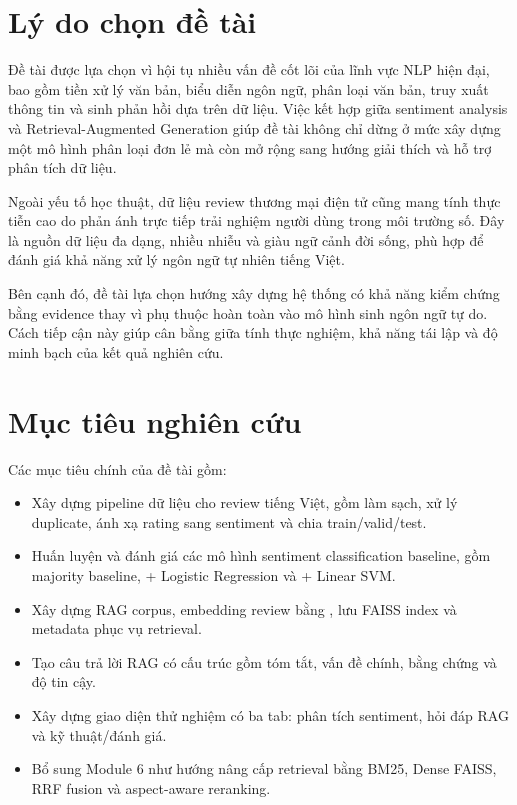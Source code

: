 \section{Lý do chọn đề tài}
Đề tài được lựa chọn vì hội tụ nhiều vấn đề cốt lõi của lĩnh vực NLP hiện đại, bao gồm tiền xử lý văn bản, biểu diễn ngôn ngữ, phân loại văn bản, truy xuất thông tin và sinh phản hồi dựa trên dữ liệu. Việc kết hợp giữa sentiment analysis và Retrieval-Augmented Generation giúp đề tài không chỉ dừng ở mức xây dựng một mô hình phân loại đơn lẻ mà còn mở rộng sang hướng giải thích và hỗ trợ phân tích dữ liệu.

Ngoài yếu tố học thuật, dữ liệu review thương mại điện tử cũng mang tính thực tiễn cao do phản ánh trực tiếp trải nghiệm người dùng trong môi trường số. Đây là nguồn dữ liệu đa dạng, nhiều nhiễu và giàu ngữ cảnh đời sống, phù hợp để đánh giá khả năng xử lý ngôn ngữ tự nhiên tiếng Việt.

Bên cạnh đó, đề tài lựa chọn hướng xây dựng hệ thống có khả năng kiểm chứng bằng evidence thay vì phụ thuộc hoàn toàn vào mô hình sinh ngôn ngữ tự do. Cách tiếp cận này giúp cân bằng giữa tính thực nghiệm, khả năng tái lập và độ minh bạch của kết quả nghiên cứu.

\section{Mục tiêu nghiên cứu}
Các mục tiêu chính của đề tài gồm:
\begin{itemize}
    \item Xây dựng pipeline dữ liệu cho review tiếng Việt, gồm làm sạch, xử lý duplicate, ánh xạ rating sang sentiment và chia train/valid/test.
    \item Huấn luyện và đánh giá các mô hình sentiment classification baseline, gồm majority baseline, \TFIDF{} + Logistic Regression và \TFIDF{} + Linear SVM.
    \item Xây dựng RAG corpus, embedding review bằng \MultilingualE{}, lưu FAISS index và metadata phục vụ retrieval.
    \item Tạo câu trả lời RAG có cấu trúc gồm tóm tắt, vấn đề chính, bằng chứng và độ tin cậy.
    \item Xây dựng giao diện thử nghiệm có ba tab: phân tích sentiment, hỏi đáp RAG và kỹ thuật/đánh giá.
    \item Bổ sung Module 6 như hướng nâng cấp retrieval bằng BM25, Dense FAISS, RRF fusion và aspect-aware reranking.
\end{itemize}

